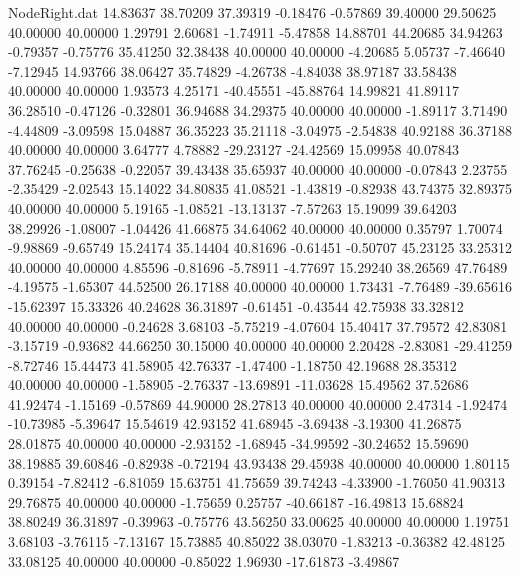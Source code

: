 \begin{filecontents}{NodeRight.dat}
  14.83637   38.70209   37.39319    -0.18476   -0.57869   39.40000   29.50625   40.00000   40.00000    1.29791    2.60681   -1.74911   -5.47858
  14.88701   44.20685   34.94263    -0.79357   -0.75776   35.41250   32.38438   40.00000   40.00000   -4.20685    5.05737   -7.46640   -7.12945
  14.93766   38.06427   35.74829    -4.26738   -4.84038   38.97187   33.58438   40.00000   40.00000    1.93573    4.25171  -40.45551  -45.88764
  14.99821   41.89117   36.28510    -0.47126   -0.32801   36.94688   34.29375   40.00000   40.00000   -1.89117    3.71490   -4.44809   -3.09598
  15.04887   36.35223   35.21118    -3.04975   -2.54838   40.92188   36.37188   40.00000   40.00000    3.64777    4.78882  -29.23127  -24.42569
  15.09958   40.07843   37.76245    -0.25638   -0.22057   39.43438   35.65937   40.00000   40.00000   -0.07843    2.23755   -2.35429   -2.02543
  15.14022   34.80835   41.08521    -1.43819   -0.82938   43.74375   32.89375   40.00000   40.00000    5.19165   -1.08521  -13.13137   -7.57263
  15.19099   39.64203   38.29926    -1.08007   -1.04426   41.66875   34.64062   40.00000   40.00000    0.35797    1.70074   -9.98869   -9.65749
  15.24174   35.14404   40.81696    -0.61451   -0.50707   45.23125   33.25312   40.00000   40.00000    4.85596   -0.81696   -5.78911   -4.77697
  15.29240   38.26569   47.76489    -4.19575   -1.65307   44.52500   26.17188   40.00000   40.00000    1.73431   -7.76489  -39.65616  -15.62397
  15.33326   40.24628   36.31897    -0.61451   -0.43544   42.75938   33.32812   40.00000   40.00000   -0.24628    3.68103   -5.75219   -4.07604
  15.40417   37.79572   42.83081    -3.15719   -0.93682   44.66250   30.15000   40.00000   40.00000    2.20428   -2.83081  -29.41259   -8.72746
  15.44473   41.58905   42.76337    -1.47400   -1.18750   42.19688   28.35312   40.00000   40.00000   -1.58905   -2.76337  -13.69891  -11.03628
  15.49562   37.52686   41.92474    -1.15169   -0.57869   44.90000   28.27813   40.00000   40.00000    2.47314   -1.92474  -10.73985   -5.39647
  15.54619   42.93152   41.68945    -3.69438   -3.19300   41.26875   28.01875   40.00000   40.00000   -2.93152   -1.68945  -34.99592  -30.24652
  15.59690   38.19885   39.60846    -0.82938   -0.72194   43.93438   29.45938   40.00000   40.00000    1.80115    0.39154   -7.82412   -6.81059
  15.63751   41.75659   39.74243    -4.33900   -1.76050   41.90313   29.76875   40.00000   40.00000   -1.75659    0.25757  -40.66187  -16.49813
  15.68824   38.80249   36.31897    -0.39963   -0.75776   43.56250   33.00625   40.00000   40.00000    1.19751    3.68103   -3.76115   -7.13167
  15.73885   40.85022   38.03070    -1.83213   -0.36382   42.48125   33.08125   40.00000   40.00000   -0.85022    1.96930  -17.61873   -3.49867

\end{filecontents}
